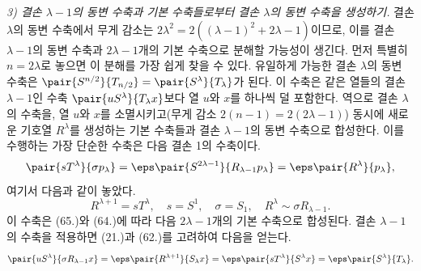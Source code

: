 
\emph{3) 결손 $\lambda-1$의 동변 수축과 기본 수축들로부터 결손 $\lambda$의 동변 수축을 생성하기.} 결손 $\lambda$의 동변 수축에서 무게 감소는 $2\lambda^2=2((\lambda-1)^2+2\lambda-1)$이므로, 이를 결손 $\lambda-1$의 동변 수축과 $2\lambda-1$개의 기본 수축으로 분해할 가능성이 생긴다. 먼저 특별히 $n=2\lambda$로 놓으면 이 분해를 가장 쉽게 찾을 수 있다. 유일하게 가능한 결손 $\lambda$의 동변 수축은 $\pair{S^{n/2}}{T_{n/2}}=\pair{S^\lambda}{T_\lambda}$가 된다. 이 수축은 같은 열들의 결손 $\lambda-1$인 수축 $\pair{uS^\lambda}{T_\lambda x}$보다 열 $u$와 $x$를 하나씩 덜 포함한다. 역으로 결손 $\lambda$의 수축을, 열 $u$와 $x$를 소멸시키고(무게 감소 $2(n-1)=2(2\lambda-1)$) 동시에 새로운 기호열 $R^\lambda$를 생성하는 기본 수축들과 결손 $\lambda-1$의 동변 수축으로 합성한다. 이를 수행하는 가장 단순한 수축은 다음 결손 1의 수축이다.
\[
 \pair{sT^\lambda}{\sigma p_\lambda}=\eps\pair{S^{2\lambda-1}}{R_{\lambda-1}p_\lambda}=\eps\pair{R^\lambda}{p_\lambda},
\]
여기서 다음과 같이 놓았다.
\[
 R^{\lambda+1}=sT^\lambda,
 \quad s=S^1,
 \quad \sigma=S_1,
 \quad R^\lambda\sim\sigma R_{\lambda-1}.
\]
이 수축은 (65.)와 (64.)에 따라 다음 $2\lambda-1$개의 기본 수축으로 합성된다.
결손 $\lambda-1$의 수축을 적용하면 (21.)과 (62.)를 고려하여 다음을 얻는다.
\[
 \pair{uS^\lambda}{\sigma R_{\lambda-1}x}=\eps\pair{R^{\lambda+1}}{S_\lambda x}
 =\eps\pair{sT^\lambda}{S^\lambda x}=\eps\pair{S^\lambda}{T_\lambda}.
\]
